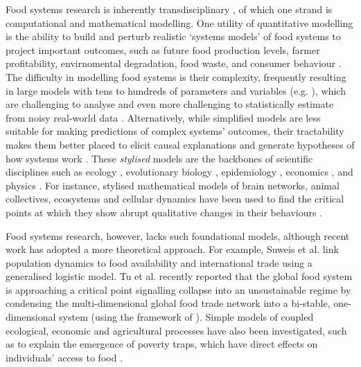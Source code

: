 \documentclass[12pt]{article}
\begin{document}
Food systems research is inherently transdisciplinary \cite{drimie2013,hammond2012}, of which one strand is computational and mathematical modelling. 
One utility of quantitative modelling is the ability to build and perturb realistic `systems models' of food systems to project important outcomes, such as future food production levels, farmer profitability, envirnomental degradation, food waste, and consumer behaviour \cite{springmann2018,marchand2016,sampedro2020,suweis2015,scalco2019,allen2016}. 
The difficulty in modelling food systems is their complexity, frequently resulting in large models with tens to hundreds of parameters and variables (e.g. \cite{sampedro2020,springmann2018}), which are challenging to analyse and even more challenging to statistically estimate from noisy real-world data \cite{sterman2000}. 
Alternatively, while simplified models are less suitable for making predictions of complex systems' outcomes, their tractability makes them better placed to elicit causal explanations and generate hypotheses of how systems work \cite{smaldino2017,smaldino2019,otto2020}. These \textit{stylised} models are the backbones of scientific disciplines such as ecology \cite{may1973}, evolutionary biology \cite{boyd2003}, epidemiology \cite{kermack1927}, economics \cite{nerlove1958}, and physics \cite{strogatz1994}. For instance, stylised mathematical models of brain networks, animal collectives, ecosystems and cellular dynamics have been used to find the critical points at which they show abrupt qualitative changes in their behaviours \cite{sole1996,scheffer2001}. 

Food systems research, however, lacks such foundational models, although recent work has adopted a more theoretical approach. 
For example, Suweis et al. \cite{suweis2015} link population dynamics to food availability and international trade using a generalised logistic model. 
Tu et al. \cite{tu2019} recently reported that the global food system is approaching a critical point signalling collapse into an unsustainable regime by condensing the multi-dimensional global food trade network into a bi-stable, one-dimensional system (using the framework of \cite{gao2016}). 
Simple models of coupled ecological, economic and agricultural processes have also been investigated, such as to explain the emergence of poverty traps, which have direct effects on individuals' access to food \cite{ngonghala2017}.
\end{document}
